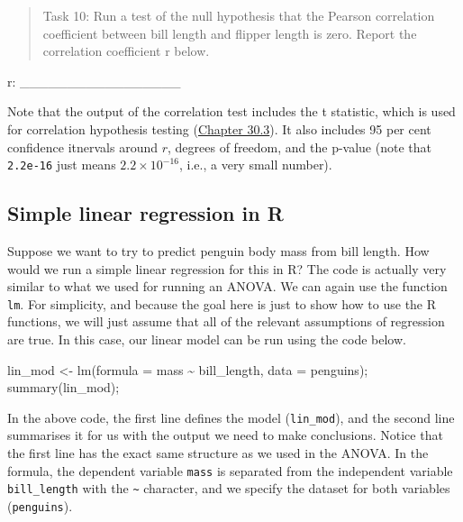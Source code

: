 \documentclass[
]{scrbook}
\newenvironment{Shaded}{\begin{snugshade}}{\end{snugshade}}
\newcommand{\AttributeTok}[1]{\textcolor[rgb]{0.77,0.63,0.00}{#1}}
\newcommand{\FunctionTok}[1]{\textcolor[rgb]{0.00,0.00,0.00}{#1}}
\newcommand{\NormalTok}[1]{#1}
\newcommand{\OtherTok}[1]{\textcolor[rgb]{0.56,0.35,0.01}{#1}}
\newcommand{\SpecialCharTok}[1]{\textcolor[rgb]{0.00,0.00,0.00}{#1}}
\begin{document}
\begin{quote}
Task 10: Run a test of the null hypothesis that the Pearson correlation coefficient between bill length and flipper length is zero. Report the correlation coefficient r below.
\end{quote}

r: \_\_\_\_\_\_\_\_\_\_\_\_\_\_\_\_\_

Note that the output of the correlation test includes the t statistic, which is used for correlation hypothesis testing (\protect\hyperlink{correlation-hypothesis-testing}{Chapter 30.3}).
It also includes 95 per cent confidence itnervals around \(r\), degrees of freedom, and the p-value (note that \texttt{2.2e-16} just means \(2.2 \times 10^{-16}\), i.e., a very small number).

\hypertarget{simple-linear-regression-in-r}{%
\subsection{Simple linear regression in R}\label{simple-linear-regression-in-r}}

Suppose we want to try to predict penguin body mass from bill length.
How would we run a simple linear regression for this in R?
The code is actually very similar to what we used for running an ANOVA.
We can again use the function \texttt{lm}.
For simplicity, and because the goal here is just to show how to use the R functions, we will just assume that all of the relevant assumptions of regression are true.
In this case, our linear model can be run using the code below.

\begin{Shaded}
\begin{Highlighting}[]
\NormalTok{lin\_mod }\OtherTok{\textless{}{-}} \FunctionTok{lm}\NormalTok{(}\AttributeTok{formula =}\NormalTok{ mass }\SpecialCharTok{\textasciitilde{}}\NormalTok{ bill\_length, }\AttributeTok{data =}\NormalTok{ penguins);}
\FunctionTok{summary}\NormalTok{(lin\_mod);}
\end{Highlighting}
\end{Shaded}

In the above code, the first line defines the model (\texttt{lin\_mod}), and the second line summarises it for us with the output we need to make conclusions.
Notice that the first line has the exact same structure as we used in the ANOVA.
In the formula, the dependent variable \texttt{mass} is separated from the independent variable \texttt{bill\_length} with the \texttt{\textasciitilde{}} character, and we specify the dataset for both variables (\texttt{penguins}).
\end{document}
